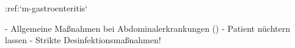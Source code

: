 %
:ref:`m-gastroenteritis`\begin{itemize}
  -   Allgemeine Maßnahmen bei Abdominalerkrankungen
  ()
  -   Patient nüchtern lassen
  -   Strikte Desinfektionsmaßnahmen!
\end{itemize}